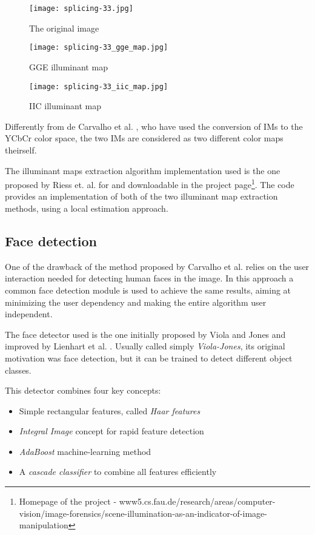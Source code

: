 \begin{figure}[!htb]
  \texttt{[image: splicing-33.jpg]}
  \caption{The original image}\label{fig:awesome_image1}
\endminipage\hfill
{}
  \texttt{[image: splicing-33\_gge\_map.jpg]}
  \caption{GGE illuminant map}\label{fig:awesome_image2}
\endminipage\hfill
{}%
  \texttt{[image: splicing-33\_iic\_map.jpg]}
  \caption{IIC illuminant map}\label{fig:awesome_image3}
\endminipage
\end{figure}

Differently from de Carvalho et al. \cite{carvalho2016illuminant}, who have used the conversion of IMs to the YCbCr color space, the two IMs are considered as two different color maps theirself.

The illuminant maps extraction algorithm implementation used is the one proposed by Riess et. al. for \cite{riess2010scene} and downloadable in the project page\footnote{Homepage of the project \cite{riess2010scene} - www5.cs.fau.de/research/areas/computer-vision/image-forensics/scene-illumination-as-an-indicator-of-image-manipulation}. The code provides an implementation of both of the two illuminant map extraction methods, using a local estimation approach.

\subsection{Face detection}

One of the drawback of the method proposed by Carvalho et al. \cite{carvalho2016illuminant} relies on the user interaction needed for detecting human faces in the image. In this approach a common face detection module is used to achieve the same results, aiming at minimizing the user dependency and making the entire algorithm user independent.

The face detector used is the one initially proposed by Viola and Jones \cite{viola2001rapid}\cite{viola2004robust} and improved by Lienhart et al. \cite{lienhart2002extended}. Usually called simply \emph{Viola-Jones}, its original motivation was face detection, but it can be trained to detect different object classes. 

This detector combines four key concepts: 
\begin{itemize}
\item Simple rectangular features, called \emph{Haar features}
\item \emph{Integral Image}\cite{crow1984summed} concept for rapid feature detection 
\item \emph{AdaBoost}\cite{freund1995desicion} machine-learning method 
\item A \emph{cascade classifier} to combine all features efficiently 
\end{itemize}

